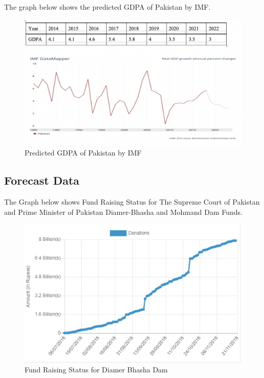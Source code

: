 \documentclass[11pt, journal,letterpaper,compsoc]{IEEEtran}
\begin{document}
The graph below shows the predicted GDPA of Pakistan by IMF. \\
\begin{figure}  [h!]
\includegraphics[width=\linewidth]{images/gdpa-imf}
 \caption{Predicted GDPA of Pakistan by IMF}
\end{figure}

\subsection{Forecast Data}

The Graph below  shows Fund Raising Status for The Supreme Court of Pakistan and Prime Minister of Pakistan Diamer-Bhasha and Mohmand Dam Funds.\\ 

\begin{figure}  [h!]
\includegraphics[width=\linewidth]{images/fund-status}
 \caption{Fund Raising Status for Diamer Bhasha Dam}
\end{figure}
\end{document}
